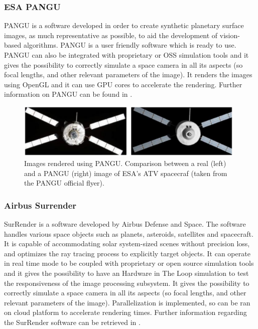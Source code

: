 \subsubsection{ESA PANGU}
PANGU is a software developed in order to create synthetic planetary surface images, as much representative as possible, to aid the development of vision-based algorithms. PANGU is a user friendly software which is ready to use. PANGU can also be integrated with proprietary or OSS simulation tools and it gives the possibility to correctly simulate a space camera in all its aspects (so focal lengths, and other relevant parameters of the image). It renders the images using OpenGL and it can use GPU cores to accelerate the rendering. Further information on PANGU can be found in \cite{10.2514/6.2004-592-389}.

\begin{figure}[htbp]
  \centering
  \includegraphics[width=0.98\textwidth]{gfx/pangu.eps}
  \caption{Images rendered using PANGU. Comparison between a real (left) and a PANGU (right) image of ESA’s ATV spacecraf (taken from the PANGU official flyer).}
  \label{fig:PANGU}
\end{figure}

\subsubsection{Airbus Surrender}
SurRender is a software developed by Airbus Defense and Space. The software handles various space objects such as planets, asteroids, satellites and spacecraft. It is capable of accommodating solar system-sized scenes without precision loss, and optimizes the ray tracing process to explicitly target objects. It can operate in real time mode to be coupled with  proprietary or open source simulation tools and it gives the possibility to have an Hardware in The Loop simulation to test the responsiveness of the image processing subsystem. It gives the possibility to correctly simulate a space camera in all its aspects (so focal lengths, and other relevant parameters of the image). Parallelization is implemented, so can be ran on cloud platform to accelerate rendering times. Further information regarding the SurRender software can be retrieved in \cite{Brochard2018ScientificIR}.

